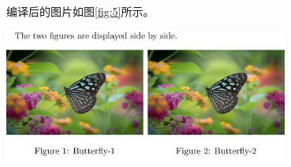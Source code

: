 编译后的图片如图\ref{fig:5}所示。

\begin{center}
    \includegraphics[width = 0.7\textwidth]{images/eg_12.png}
    \label{fig:5}
\end{center}